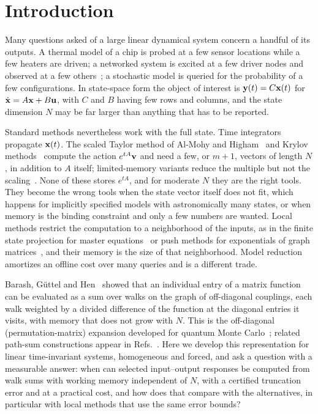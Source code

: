 \section{Introduction}\label{sec:intro}

Many questions asked of a large linear dynamical system concern a handful of its outputs. A thermal model of a chip is probed at a few sensor locations while a few heaters are driven; a networked system is excited at a few driver nodes and observed at a few others~\cite{liu2011,pasqualetti2014,mesbahi2010}; a stochastic model is queried for the probability of a few configurations. In state-space form the object of interest is ${\bf y}(t)=C{\bf x}(t)$ for $\dot{{\bf x}}=A{\bf x}+B{\bf u}$, with $C$ and $B$ having few rows and columns, and the state dimension $N$ may be far larger than anything that has to be reported.

Standard methods nevertheless work with the full state. Time integrators propagate ${\bf x}(t)$. The scaled Taylor method of Al-Mohy and Higham~\cite{almohy2011} and Krylov methods~\cite{hochbruck1997,sidje1998} compute the action $e^{tA}{\bf v}$ and need a few, or $m+1$, vectors of length $N$, in addition to $A$ itself; limited-memory variants reduce the multiple but not the scaling~\cite{guttel2020}. None of these stores $e^{tA}$, and for moderate $N$ they are the right tools. They become the wrong tools when the state vector itself does not fit, which happens for implicitly specified models with astronomically many states, or when memory is the binding constraint and only a few numbers are wanted. Local methods restrict the computation to a neighborhood of the inputs, as in the finite state projection for master equations~\cite{munsky2006} or push methods for exponentials of graph matrices~\cite{kloster2014,gleich2015}, and their memory is the size of that neighborhood. Model reduction~\cite{antoulas2005} amortizes an offline cost over many queries and is a different trade.

Barash, G\"uttel and Hen~\cite{barash2022} showed that an individual entry of a matrix function can be evaluated as a sum over walks on the graph of off-diagonal couplings, each walk weighted by a divided difference of the function at the diagonal entries it visits, with memory that does not grow with $N$. This is the off-diagonal (permutation-matrix) expansion developed for quantum Monte Carlo~\cite{albash2017,gupta2020pmr}; related path-sum constructions appear in Refs.~\cite{giscard2013,giscard2015,gorban2011}. Here we develop this representation for linear time-invariant systems, homogeneous and forced, and ask a question with a measurable answer: when can selected input--output responses be computed from walk sums with working memory independent of $N$, with a certified truncation error and at a practical cost, and how does that compare with the alternatives, in particular with local methods that use the same error bounds?

